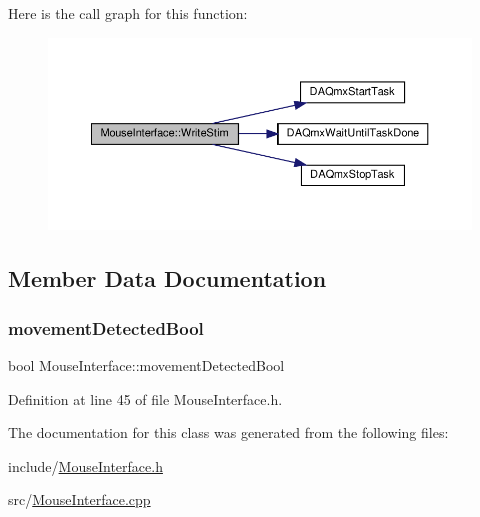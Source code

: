Here is the call graph for this function\+:
\nopagebreak
\begin{figure}[H]
\begin{center}
\leavevmode
\includegraphics[width=350pt]{class_mouse_interface_a292f829bcd243f2b462b20b83b5dc273_cgraph}
\end{center}
\end{figure}


\subsection{Member Data Documentation}
\mbox{\label{class_mouse_interface_a4186b7fa2d8eaef8bb90ad11fe7f07ef}} 
\subsubsection{\texorpdfstring{movement\+Detected\+Bool}{movementDetectedBool}}
{\footnotesize\ttfamily bool Mouse\+Interface\+::movement\+Detected\+Bool}



Definition at line 45 of file Mouse\+Interface.\+h.



The documentation for this class was generated from the following files\+:\begin{DoxyCompactItemize}
\item 
include/\hyperlink{_mouse_interface_8h}{Mouse\+Interface.\+h}\item 
src/\hyperlink{_mouse_interface_8cpp}{Mouse\+Interface.\+cpp}\end{DoxyCompactItemize}
